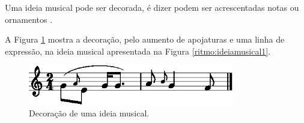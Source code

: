 Uma ideia musical pode ser decorada, é dizer podem ser acrescentadas notas ou ornamentos
\cite[pp. 30]{bennett1993elementos}.

A Figura \ref{ritmo:decoracao-ex1} mostra a decoração, pelo aumento de apojaturas e uma linha de expressão, 
na ideia musical apresentada na Figura \ref{ritmo:ideiamusical1}.
\begin{figure}[H]
\centering
    \includegraphics[width=0.8\textwidth]{chapters/cap-musica-composer/decoracao-ex1-1.eps}
\caption{Decoração de uma ideia musical.}
\label{ritmo:decoracao-ex1}
\end{figure}

